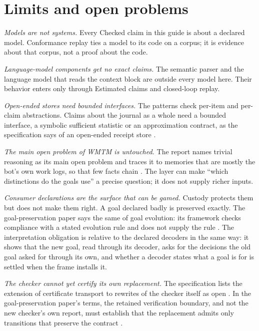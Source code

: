 \documentclass[11pt]{article}
\theoremstyle{definition}
\theoremstyle{plain}
\begin{document}
\section{Limits and open problems}\label{sec:limits}

\emph{Models are not systems.} Every Checked claim in this guide is about a declared model.
Conformance replay ties a model to its code on a corpus; it is evidence about that corpus, not a
proof about the code.

\emph{Language-model components get no exact claims.} The semantic parser and the language model
that reads the context block are outside every model here. Their behavior enters only through
Estimated claims and closed-loop replay.

\emph{Open-ended stores need bounded interfaces.} The patterns check per-item and per-claim
abstractions. Claims about the journal as a whole need a bounded interface, a symbolic sufficient
statistic or an approximation contract, as the specification says of an open-ended receipt store
\cite[Section~12.4]{spec}.

\emph{The main open problem of WMTM is untouched.} The report names trivial reasoning as its main
open problem and traces it to memories that are mostly the bot's own work logs, so that few facts
chain \cite{wmtm}. The layer can make ``which distinctions do the goals use'' a precise question;
it does not supply richer inputs.

\emph{Consumer declarations are the surface that can be gamed.} Custody protects them but does not
make them right. A goal declared badly is preserved exactly. The goal-preservation paper says the
same of goal evolution: its framework checks compliance with a stated evolution rule and does not
supply the rule \cite{goalpres}. The interpretation obligation is relative to the declared
decoders in the same way: it shows that the new goal, read through its decoder, asks for the
decisions the old goal asked for through its own, and whether a decoder states what a goal is for
is settled when the frame installs it.

\emph{The checker cannot yet certify its own replacement.} The specification lists the extension of
certificate transport to rewrites of the checker itself as open \cite[Section~16.5]{spec}. In the
goal-preservation paper's terms, the retained verification boundary, and not the new checker's own
report, must establish that the replacement admits only transitions that preserve the contract
\cite{goalpres}.
\end{document}
